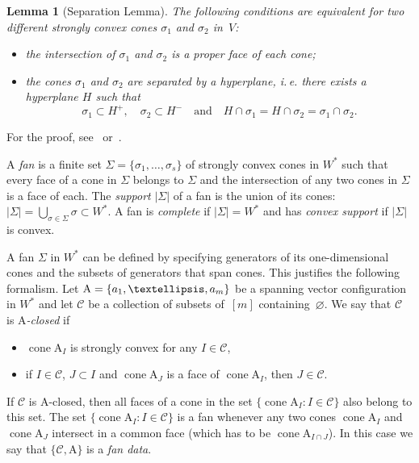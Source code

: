 \documentclass[a4paper]{amsart}
\newtheorem{lemma}[theorem]{Lemma}
\theoremstyle{definition}
\theoremstyle{remark}
\numberwithin{equation}{section}
\newcommand{\mb}[1]{{\textbf {\textit#1}}}
\def\cone{\mathop{\mathrm{cone}}}
\newcommand{\<}{\langle}
\renewcommand{\>}{\rangle}
\begin{document}
\begin{lemma}[Separation Lemma]\label{separation}
The following conditions are equivalent for two different strongly convex cones $\sigma_1$ and $\sigma_2$ in~$V$:
\begin{itemize}
\item[(a)] the intersection of $\sigma_1$ and $\sigma_2$ is a proper face of each cone;

\item[(b)] the cones $\sigma_1$ and $\sigma_2$ are separated by a hyperplane, i.\,e. there exists a hyperplane $H$ such that 
\[
  \sigma_1\subset H^+,\quad  \sigma_2\subset H^-\quad\text{and}\quad
  H\cap\sigma_1=H\cap\sigma_2=\sigma_1\cap\sigma_2. 
\]
\end{itemize}
\end{lemma}

For the proof, see~\cite[\S1.2]{fult93} or~\cite[Lemma~1.2.13]{c-l-s11}.

A \emph{fan} is a finite set $\Sigma=\{\sigma_1,\ldots,\sigma_s\}$ of strongly convex cones in $W^*$ such that every face of a cone in $\Sigma$ belongs to $\Sigma$ and the intersection of any two cones in $\Sigma$ is a face of each. The \emph{support}  $|\Sigma|$ of a fan is the union of its cones: $|\Sigma|=\bigcup_{\sigma\in\Sigma}\sigma\subset W^*$. A fan is \emph{complete} if $|\Sigma|=W^*$ and has \emph{convex support} if $|\Sigma|$ is convex.


A fan $\Sigma$ in $W^*$ can be defined by specifying generators of its one-dimensional cones and the subsets of generators that span cones. This justifies the following formalism. Let $\mathrm A=\{\mb a_1,\ldots,\mb a_m\}$ be a spanning vector configuration in $W^*$ and let $\mathcal C$ be a collection of subsets 
of~$[m]$ containing~$\varnothing$. We say that $\mathcal C$ is \emph{$\mathrm A$-closed} if 
\begin{itemize}
\item
$\cone\mathrm A_I$ is strongly convex for any $I\in\mathcal C$,

\item if $I\in\mathcal C$, $J\subset I$ and $\cone\mathrm A_J$ is a face of $\cone\mathrm A_I$, then $J\in\mathcal C$.
\end{itemize}
If $\mathcal C$ is $\mathrm A$-closed, then all faces of a cone in the set 
$\{\cone \mathrm A_I\colon I\in\mathcal C\}$ also belong to this set. The set $\{\cone \mathrm A_I\colon I\in\mathcal C\}$ is a fan whenever any two cones $\cone\mathrm A_I$ and $\cone\mathrm A_J$ intersect in a common face (which has to be $\cone\mathrm A_{I\cap J}$). In this case we say that $\{\mathcal C,\mathrm A\}$ is a \emph{fan data}.
\end{document}
